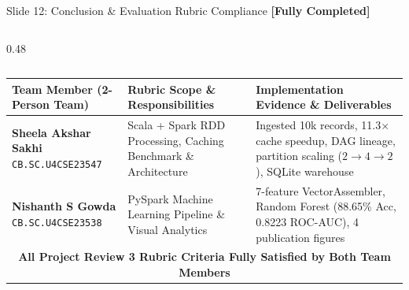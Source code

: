 \documentclass[aspectratio=169]{beamer}
\begin{document}
\begin{frame}{Slide 12: Conclusion \& Evaluation Rubric Compliance \hfill \footnotesize\color{AmritaMaroon}\textbf{[Fully Completed]}}
\begin{columns}[T]
\begin{column}{0.48\textwidth}
        \end{column}
    \end{columns}
    \vspace{0.10cm}
    \begin{center}
    {\fontsize{5.2}{6.5}\selectfont
    \renewcommand{\arraystretch}{1.15}
    \begin{tabular}{|p{3.2cm}|p{4.7cm}|p{5.4cm}|}
        \hline
        \textbf{Team Member (2-Person Team)} & \textbf{Rubric Scope \& Responsibilities} & \textbf{Implementation Evidence \& Deliverables} \\
        \hline
        \textbf{Sheela Akshar Sakhi} \newline \texttt{CB.SC.U4CSE23547} & Scala + Spark RDD Processing, Caching Benchmark \& Architecture & Ingested 10k records, 11.3$\times$ cache speedup, DAG lineage, partition scaling ($2\to4\to2$), SQLite warehouse \\
        \hline
        \textbf{Nishanth S Gowda} \newline \texttt{CB.SC.U4CSE23538} & PySpark Machine Learning Pipeline \& Visual Analytics & 7-feature VectorAssembler, Random Forest (88.65\% Acc, 0.8223 ROC-AUC), 4 publication figures \\
        \hline
        \multicolumn{3}{|c|}{\textbf{All Project Review 3 Rubric Criteria Fully Satisfied by Both Team Members}} \\
        \hline
    \end{tabular}
    }
    \end{center}
\end{frame}

\appendix
\end{document}
